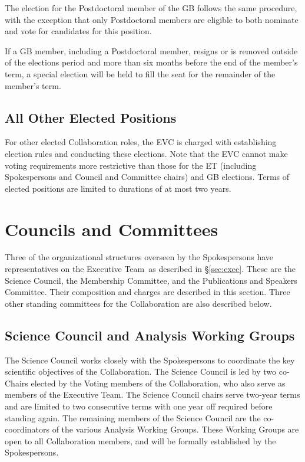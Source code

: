 \documentclass[12pt]{article}
\newcommand{\exec}{{Executive Team}}
\begin{document}
The election for the Postdoctoral member of the GB follows the same procedure, with the exception that only Postdoctoral members are eligible to both nominate and vote for candidates for this position.

If a GB member, including a Postdoctoral member, resigns or is removed outside of the elections period and more than six months before the end of the member's term, a special election will be held to fill the seat for the remainder of the member's term.

\subsection{All Other Elected Positions}

For other elected Collaboration roles, the EVC is charged with establishing election rules and conducting these elections. Note that the EVC cannot make voting requirements more restrictive than those for the ET (including Spokespersons and Council and Committee chairs) and GB elections. Terms of elected positions are limited to durations of at most two years. 

\section{Councils and Committees}
\label{sec:councils}

Three of the organizational structures overseen by the Spokespersons have representatives on the \exec\ as described in \S\ref{sec:exec}.  These are the Science Council, the Membership Committee, and the Publications and Speakers Committee.  Their composition and charges are described in this section.  Three other standing committees for the Collaboration are also described below.  

\subsection{Science Council and Analysis Working Groups}
\label{sec:SC}

The Science Council works closely with the Spokespersons to coordinate the key scientific objectives of the Collaboration.  The Science Council is led by two co-Chairs elected by the Voting members of the Collaboration, who also serve as members of the \exec. The Science Council chairs serve two-year terms and are limited to two consecutive terms with one year off required before standing again.
The remaining members of the Science Council are the co-coordinators of the various Analysis Working Groups. These Working Groups are open to all Collaboration members, and will be formally established by the Spokespersons.  
\end{document}
